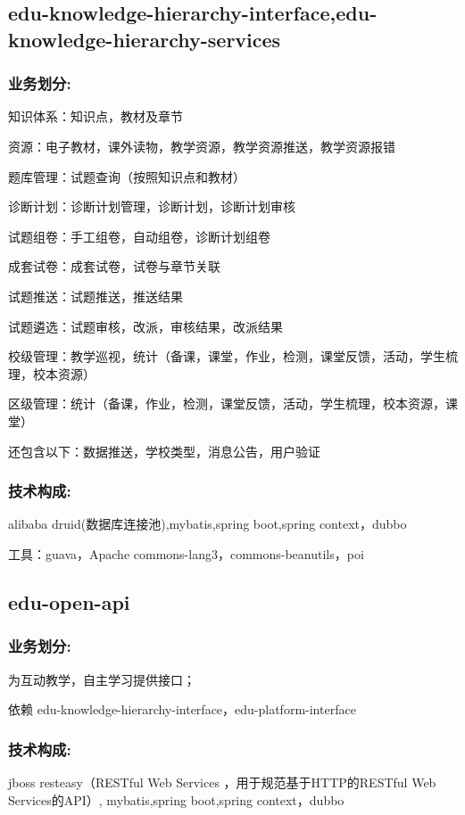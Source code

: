 \documentclass[UTF8]{ctexart}
\begin{document}
\subsection{edu-knowledge-hierarchy-interface,edu-knowledge-hierarchy-services}
\subsubsection{业务划分:}
知识体系：知识点，教材及章节

    资源：电子教材，课外读物，教学资源，教学资源推送，教学资源报错

题库管理：试题查询（按照知识点和教材）

诊断计划：诊断计划管理，诊断计划，诊断计划审核

试题组卷：手工组卷，自动组卷，诊断计划组卷

成套试卷：成套试卷，试卷与章节关联

试题推送：试题推送，推送结果

试题遴选：试题审核，改派，审核结果，改派结果

校级管理：教学巡视，统计（备课，课堂，作业，检测，课堂反馈，活动，学生梳理，校本资源）

区级管理：统计（备课，作业，检测，课堂反馈，活动，学生梳理，校本资源，课堂）

还包含以下：数据推送，学校类型，消息公告，用户验证


\subsubsection{技术构成:}
alibaba druid(数据库连接池),mybatis,spring boot,spring context，dubbo

工具：guava，Apache commons-lang3，commons-beanutils，poi


\subsection{edu-open-api}
\subsubsection{业务划分:}
为互动教学，自主学习提供接口；

依赖 edu-knowledge-hierarchy-interface，edu-platform-interface
\subsubsection{技术构成:}
jboss resteasy（RESTful Web Services ，用于规范基于HTTP的RESTful Web Services的API）,
mybatis,spring boot,spring context，dubbo
\end{document}
